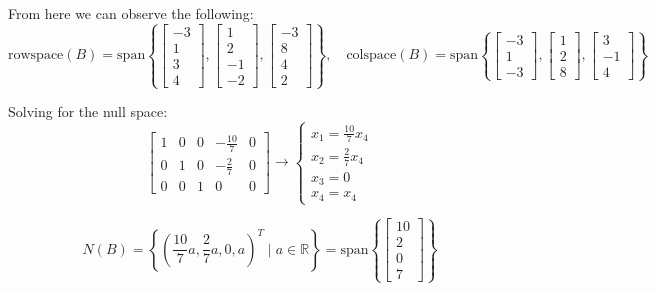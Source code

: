 \documentclass{article}
\begin{document}
\noindent From here we can observe the following:
$$
\text{rowspace}(B) = \text{span}\left\{ \begin{bmatrix} -3 \\ 1 \\ 3 \\ 4 \end{bmatrix}, \begin{bmatrix} 1 \\ 2 \\ -1 \\ -2 \end{bmatrix}, \begin{bmatrix} -3 \\ 8 \\ 4 \\ 2 \end{bmatrix} \right\}
,\quad
\text{colspace}(B) = \text{span}\left\{ \begin{bmatrix} -3 \\ 1 \\ -3 \end{bmatrix}, \begin{bmatrix} 1 \\ 2 \\ 8 \end{bmatrix}, \begin{bmatrix} 3 \\ -1 \\ 4 \end{bmatrix} \right\}
$$

\noindent Solving for the null space:
$$
\left[\begin{array}{cccc|c} 1 & 0 & 0 & -\frac{10}{7} & 0 \\ 0 & 1 & 0 & -\frac{2}{7} & 0 \\ 0 & 0 & 1 & 0 & 0 \end{array}\right]
\rightarrow
\begin{cases} x_1 = \frac{10}{7}x_4 \\ x_2 = \frac{2}{7}x_4 \\ x_3 = 0 \\ x_4 = x_4 \end{cases}
$$

$$
N(B) = \left\{ \left(\frac{10}{7}a, \frac{2}{7}a, 0, a\right)^T \mid a \in \mathbb{R} \right\}
= \text{span}\left\{ \begin{bmatrix} 10 \\ 2 \\ 0 \\ 7 \end{bmatrix} \right\}
$$
\end{document}
